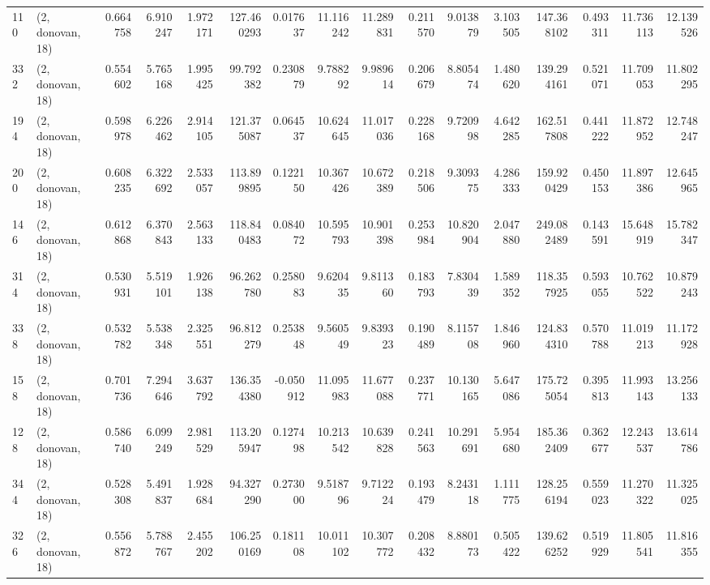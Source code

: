 \begin{tabular}{llrrrrrrrrrrrrrr}
110 &  (2, donovan, 18) &   0.664758 &   6.910247 &   1.972171 &   127.460293 &   0.017637 &  11.116242 &  11.289831 &  0.211570 &   9.013879 &   3.103505 &   147.368102 &  0.493311 &  11.736113 &  12.139526 \\
332 &  (2, donovan, 18) &   0.554602 &   5.765168 &   1.995425 &    99.792382 &   0.230879 &   9.788292 &   9.989614 &  0.206679 &   8.805474 &   1.480620 &   139.294161 &  0.521071 &  11.709053 &  11.802295 \\
194 &  (2, donovan, 18) &   0.598978 &   6.226462 &   2.914105 &   121.375087 &   0.064537 &  10.624645 &  11.017036 &  0.228168 &   9.720998 &   4.642285 &   162.517808 &  0.441222 &  11.872952 &  12.748247 \\
200 &  (2, donovan, 18) &   0.608235 &   6.322692 &   2.533057 &   113.899895 &   0.122150 &  10.367426 &  10.672389 &  0.218506 &   9.309375 &   4.286333 &   159.920429 &  0.450153 &  11.897386 &  12.645965 \\
146 &  (2, donovan, 18) &   0.612868 &   6.370843 &   2.563133 &   118.840483 &   0.084072 &  10.595793 &  10.901398 &  0.253984 &  10.820904 &   2.047880 &   249.082489 &  0.143591 &  15.648919 &  15.782347 \\
314 &  (2, donovan, 18) &   0.530931 &   5.519101 &   1.926138 &    96.262780 &   0.258083 &   9.620435 &   9.811360 &  0.183793 &   7.830439 &   1.589352 &   118.357925 &  0.593055 &  10.762522 &  10.879243 \\
338 &  (2, donovan, 18) &   0.532782 &   5.538348 &   2.325551 &    96.812279 &   0.253848 &   9.560549 &   9.839323 &  0.190489 &   8.115708 &   1.846960 &   124.834310 &  0.570788 &  11.019213 &  11.172928 \\
158 &  (2, donovan, 18) &   0.701736 &   7.294646 &   3.637792 &   136.354380 &  -0.050912 &  11.095983 &  11.677088 &  0.237771 &  10.130165 &   5.647086 &   175.725054 &  0.395813 &  11.993143 &  13.256133 \\
128 &  (2, donovan, 18) &   0.586740 &   6.099249 &   2.981529 &   113.205947 &   0.127498 &  10.213542 &  10.639828 &  0.241563 &  10.291691 &   5.954680 &   185.362409 &  0.362677 &  12.243537 &  13.614786 \\
344 &  (2, donovan, 18) &   0.528308 &   5.491837 &   1.928684 &    94.327290 &   0.273000 &   9.518796 &   9.712224 &  0.193479 &   8.243118 &   1.111775 &   128.256194 &  0.559023 &  11.270322 &  11.325025 \\
326 &  (2, donovan, 18) &   0.556872 &   5.788767 &   2.455202 &   106.250169 &   0.181108 &  10.011102 &  10.307772 &  0.208432 &   8.880173 &   0.505422 &   139.626252 &  0.519929 &  11.805541 &  11.816355 \\

\end{tabular}
